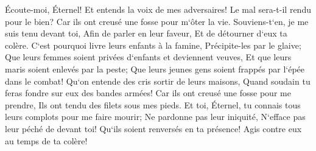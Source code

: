 \verse Écoute-moi, Éternel! Et entends la voix de mes adversaires! 
\verse Le mal sera-t-il rendu pour le bien? Car ils ont creusé une fosse pour m`ôter la vie. Souviens-t`en, je me suis tenu devant toi, Afin de parler en leur faveur, Et de détourner d`eux ta colère. 
\verse C`est pourquoi livre leurs enfants à la famine, Précipite-les par le glaive; Que leurs femmes soient privées d`enfants et deviennent veuves, Et que leurs maris soient enlevés par la peste; Que leurs jeunes gens soient frappés par l`épée dans le combat! 
\verse Qu`on entende des cris sortir de leurs maisons, Quand soudain tu feras fondre sur eux des bandes armées! Car ils ont creusé une fosse pour me prendre, Ils ont tendu des filets sous mes pieds. 
\verse Et toi, Éternel, tu connais tous leurs complots pour me faire mourir; Ne pardonne pas leur iniquité, N`efface pas leur péché de devant toi! Qu`ils soient renversés en ta présence! Agis contre eux au temps de ta colère! 

